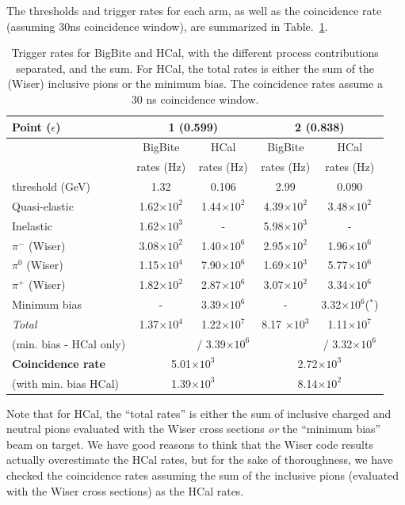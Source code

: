 The thresholds and trigger rates for each arm, as well as the coincidence rate (assuming 30ns coincidence window), are summarized in Table.~\ref{tab:TrigRates}.
%
\begin{center}
\begin{table}[h]
\begin{tabular}{|l|c|c|c|c|}
\hline
Point ($\epsilon$) & \multicolumn{2}{|c|}{1 (0.599)} & \multicolumn{2}{c|}{2 (0.838)} \\
\hline
& BigBite & HCal & BigBite & HCal \\ 
& rates (Hz) & rates (Hz) & rates (Hz) & rates (Hz) \\
\hline
threshold (GeV) & 1.32 & 0.106 & 2.99 & 0.090 \\
\hline
Quasi-elastic   & 1.62$\times 10^{2}$ & 1.44$\times 10^{2}$ & 4.39$\times 10^{2}$ & 3.48$\times 10^{2}$ \\
Inelastic       & 1.62$\times 10^{3}$ & - & 5.98$\times 10^{3}$ & - \\
$\pi^-$ (Wiser) & 3.08$\times 10^{2}$ & 1.40$\times 10^{6}$ & 2.95$\times 10^{2}$ & 1.96$\times 10^{6}$ \\
$\pi^0$ (Wiser) & 1.15$\times 10^{4}$ & 7.90$\times 10^{6}$ & 1.69$\times 10^{3}$ & 5.77$\times 10^{6}$ \\
$\pi^+$ (Wiser) & 1.82$\times 10^{2}$ & 2.87$\times 10^{6}$ & 3.07$\times 10^{2}$ & 3.34$\times 10^{6}$ \\
Minimum bias    & - & 3.39$\times 10^{6}$ & - & 3.32$\times 10^{6}$($^*$) \\ 
\hline
{\em Total} & 1.37$\times 10^{4}$ & 1.22$\times 10^{7}$ & 8.17 $\times 10^{3}$ & 1.11$\times 10^{7}$ \\
(min. bias - HCal only) &  & / 3.39$\times 10^{6}$ &  & / 3.32$\times 10^{6}$ \\
\hline
{\bf Coincidence rate} & \multicolumn{2}{|c|}{5.01$\times 10^{3}$} & \multicolumn{2}{c|}{2.72$\times 10^{3}$} \\
(with min. bias HCal) & \multicolumn{2}{|c|}{1.39$\times 10^{3}$} & \multicolumn{2}{|c|}{8.14$\times 10^{2}$} \\
\hline
\end{tabular} 
\caption{Trigger rates for BigBite and HCal, with the different process contributions separated, and the sum. For HCal, the total rates is either the sum of the (Wiser) inclusive pions or the minimum bias. The coincidence rates assume a 30 ns coincidence window.}
\label{tab:TrigRates}
\end{table}
\end{center}
%
Note that for HCal, the ``total rates'' is either the sum of inclusive charged and neutral pions evaluated with the Wiser cross sections {\em or} the ``minimum bias'' beam on target. We have good reasons to think that the Wiser code results actually overestimate the HCal rates, but for the sake of thoroughness, we have checked the coincidence rates assuming the sum of the inclusive pions (evaluated with the Wiser cross sections) as the HCal rates.

